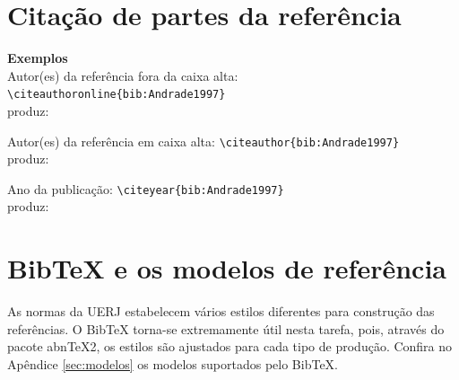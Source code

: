 \documentclass[a4paper,12pt,oneside,onecolumn,final,fleqn]{repUERJ}
\begin{document}
\section{Citação de partes da referência}

\noindent\textbf{Exemplos}\\

\noindent Autor(es) da referência fora da caixa alta: \texttt{\textbackslash citeauthoronline\{bib:Andrade1997\}} \\
\hspace*{\parindent}produz: 

\noindent Autor(es) da referência em caixa alta: \texttt{\textbackslash citeauthor\{bib:Andrade1997\}} \\
\hspace*{\parindent}produz: \citeauthor{bib:Andrade1997}

\noindent Ano da publicação: \texttt{\textbackslash citeyear\{bib:Andrade1997\}} \\
\hspace*{\parindent}produz: \citeyear{bib:Andrade1997}

\section{\textsf{BibTeX} e os modelos de referência}

As normas da UERJ estabelecem vários estilos diferentes para construção das referências. O \textsf{BibTeX} torna-se extremamente útil nesta tarefa, pois, através do pacote \textsf{abnTeX2}, os estilos são ajustados para cada tipo de produção. Confira no Apêndice \ref{sec:modelos} os modelos suportados pelo \textsf{BibTeX}.
\end{document}
